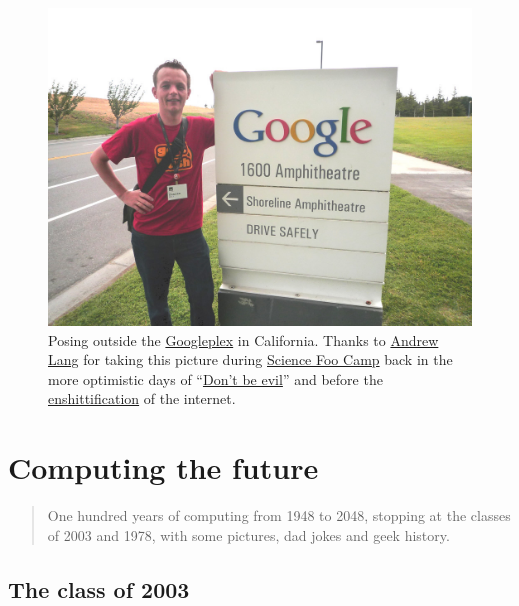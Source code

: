 \documentclass[
  12pt,
]{book}
\begin{document}
\begin{figure}

{\centering \includegraphics[width=1\linewidth]{images/dooncan-hool} 

}

\caption{Posing outside the \href{https://en.wikipedia.org/wiki/Googleplex}{Googleplex} in California. Thanks to \href{https://www.linkedin.com/in/andrewlang}{Andrew Lang} for taking this picture during \href{https://en.wikipedia.org/wiki/Science_Foo_Camp}{Science Foo Camp} back in the more optimistic days of ``\href{https://en.wikipedia.org/wiki/Don\%27t_be_evil}{Don't be evil}'' \citep{dontbeevil, scifoo2007, scifoo2009} and before the \href{https://en.wikipedia.org/wiki/Enshittification}{enshittification} of the internet. \citep{internetcon}}\label{fig:unnamed-chunk-10}
\end{figure}



\hypertarget{appendix-postscript}{%
\appendix}


\hypertarget{mastersofscience}{%
\chapter{Computing the future}\label{mastersofscience}}

\begin{quote}
One hundred years of computing from 1948 to 2048, stopping at the classes of 2003 and 1978, with
some pictures, dad jokes and geek history.
\end{quote}

\hypertarget{y2003}{%
\section{The class of 2003}\label{y2003}}
\end{document}
